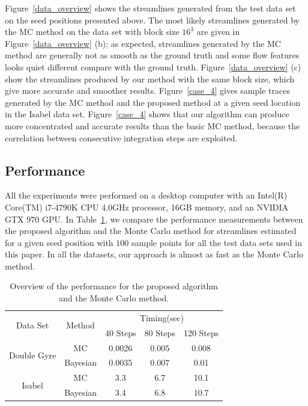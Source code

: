 Figure~\ref{data_overview} shows the streamlines generated from the test data set on the seed positions presented above. The most likely streamlines generated by the MC method on the data set with block size $16^3$ are given in Figure~\ref{data_overview} (b); as expected, streamlines generated by the MC method are generally not as smooth as the ground truth and some flow features looks quiet different compare with the ground truth. Figure~\ref{data_overview} (c) show the streamlines produced by our method with the same block size, which give more accurate and smoother results. Figure~\ref{case_4} gives sample traces generated by the MC method and the proposed method at a given seed location in the Isabel data set. Figure~\ref{case_4} shows that our algorithm can produce more concentrated and accurate results than the basic MC method, because the correlation between consecutive integration steps are exploited.

\subsection{Performance}

All the experiments were performed on a desktop computer with an Intel(R) Core(TM) i7-4790K CPU 4.0GHz processor, 16GB memory, and an NVIDIA GTX 970 GPU. In Table~\ref{timing}, we compare the performance measurements between the proposed algorithm and the Monte Carlo method for streamlines estimated for a given seed position with $100$ sample points for all the test data sets used in this paper. In all the datasets, our approach is almost as fast as the Monte Carlo method.

\begin{table}[!htb]
\centering
\begin{tabular}{|c|c|c|c|c|}
\hline
\multirow{2}{*}{Data Set}    & \multirow{2}{*}{Method}     & \multicolumn{3}{c|}{Timing(sec)}  \\ \cline{3-5}
                             &                             & 40 Steps  & 80 Steps & 120 Steps  \\ \hline
\multirow{2}{*}{Double Gyre} & MC                          & 0.0026    & 0.005    & 0.008      \\ \cline{2-5}
                             & Bayesian             & 0.0035    & 0.007    & 0.01       \\ \hline
\multirow{2}{*}{Isabel}      & MC                          & 3.3       & 6.7      & 10.1       \\ \cline{2-5}
                             & Bayesian             & 3.4       & 6.8      & 10.7       \\ \hline

\end{tabular}
\caption{Overview of the performance for the proposed algorithm and the Monte Carlo method.}
\label{timing}
\end{table}
